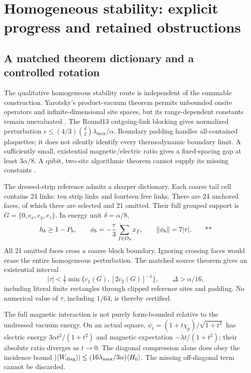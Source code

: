 \section{Homogeneous stability: explicit progress and retained obstructions}
\label{sec:middle-homogeneous}

\subsection{A matched theorem dictionary and a controlled rotation \workstar}
\label{sec:middle-rotation}

The qualitative homogeneous stability route is independent of the summable
construction. Yarotsky's product-vacuum theorem permits unbounded onsite
operators and infinite-dimensional site spaces, but its range-dependent
constants remain unevaluated \cite{yarotsky2004quasiparticles}.
The Round13 outgoing-link blocking gives normalized perturbation
\(\epsilon\le(4/3)\binom d2\lambda_{\max}/\alpha\).
Boundary padding handles all-contained plaquettes; it does not silently
identify every thermodynamic boundary limit. A sufficiently small,
existential magnetic/electric ratio gives a fixed-spacing gap at least
\(3\alpha/8\). A qubit, two-site algorithmic theorem cannot supply its
missing constants \cite{bravyi2008polynomial}.

The dressed-strip reference admits a sharper dictionary. Each coarse tail
cell contains 24 links: ten strip links and fourteen free links.
There are 24 anchored faces, of which three are selected and 21 omitted.
Their full grouped support is
\(G=\{0,e_x,e_y,e_z\}\). In energy unit \(\delta=\alpha/8\),
\[
 h_b\ge1-P_b,\qquad
 \phi_b=-\frac{\tau}{3}\sum_{f\in O_b}x_f,\qquad
 \left\lVert \phi_b\right\rVert=7|\tau|.
 \qquad\text{**}
\]
All 21 omitted faces cross a coarse block boundary. Ignoring crossing
faces would erase the entire homogeneous perturbation.
The matched source theorem gives an existential interval
\[
 |\tau|<\tfrac17\min\{c_1(G),[2c_2(G)]^{-1}\},
 \qquad \Delta>\alpha/16,
\]
including literal finite rectangles through clipped reference sites and
padding. No numerical value of \(\tau\), including \(1/64\), is thereby
certified.

The full magnetic interaction is not purely form-bounded relative to
the undressed vacuum energy. On an actual square,
\(\psi_t=(1+t\chi_p)/\sqrt{1+t^2}\) has electric energy
\(3\alpha t^2/(1+t^2)\) and magnetic expectation
\(-\lambda t/(1+t^2)\); their absolute ratio diverges as \(t\to0\).
The diagonal compression alone does obey the incidence bound
\(|\langle W_{\rm diag}\rangle|\le
(16\lambda_{\max}/3\alpha)\langle H_0\rangle\).
The missing off-diagonal term cannot be discarded.


